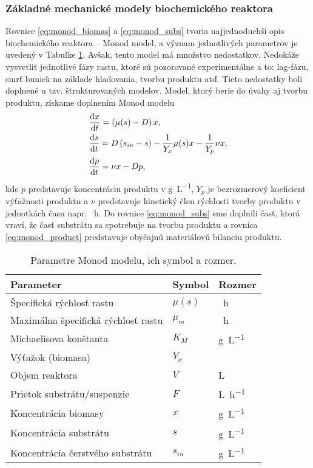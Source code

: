 \subsubsection{Základné mechanické modely biochemického reaktora}
Rovnice \eqref{eq:monod_biomas} a \eqref{eq:monod_subs} tvoria najjednoduchší opis biochemického reaktora -- Monod model, a význam jednotlivých parametrov je uvedený v Tabuľke \ref{tab:monod_params}. Avšak, tento model má množstvo nedostatkov. Nedokáže vysvetliť jednotlivé fázy rastu, ktoré sú pozorované experimentálne a to: lag-fázu, smrť buniek na základe hladovania, tvorbu produktu atď. Tieto nedostatky boli doplnené u tzv. štrukturovaných modelov. Model, ktorý berie do úvahy aj tvorbu produktu, získame doplnením Monod modelu
\begin{align} 
&\frac{\text{d}x}{\text{d}t} = \left(\mu(s) - D\right)x, \\
&\frac{\text{d}s}{\text{d}t} = D\left(s_{in} - s\right) - \frac{1}{Y_{x}}\mu(s)x - \frac{1}{Y_{p}}\nu x, \\
&\frac{\text{d}p}{\text{d}t} = \nu x - Dp, \label{eq:monod_product}
\end{align}
kde $p$ predstavuje koncentráciu produktu v \si{\gram\per\liter}, $Y_{p}$ je bezrozmerový koeficient výťažnosti produktu a $\nu$ predstavuje kinetický člen rýchlosti tvorby produktu v jednotkách času napr. \si{\per\hour}. Do rovnice \eqref{eq:monod_subs} sme doplnili časť, ktorá vraví, že časť substrátu sa spotrebuje na tvorbu produktu a rovnica \eqref{eq:monod_product} predstavuje obyčajnú materiálovú bilanciu produktu. 

\begin{table}
	\centering
	\caption{Parametre Monod modelu, ich symbol a rozmer.}
	\label{tab:monod_params}
	\begin{tabular}{lll}
		\hline
		\textbf{Parameter} & \textbf{Symbol} & \textbf{Rozmer} \\
		\hline
		Špecifická rýchlosť rastu & $\mu(s)$ & \si{\per\hour} \\
		Maximálna špecifická rýchlosť rastu & $\mu_{m}$ & \si{\per\hour} \\
		Michaelisova konštanta & $K_{M}$ & \si{\gram\per\liter} \\
		Výťažok (biomasa) & $Y_{x}$ & \\
		Objem reaktora & $V$ & \si{\liter} \\
		Prietok substrátu/suspenzie & $F$ & \si{\liter\per\hour} \\
		Koncentrácia biomasy & $x$ & \si{\gram\per\liter} \\
		Koncentrácia substrátu & $s$ & \si{\gram\per\liter} \\
		Koncentrácia čerstvého substrátu & $s_{in}$ & \si{\gram\per\liter} \\
		\hline
	\end{tabular}
\end{table}


